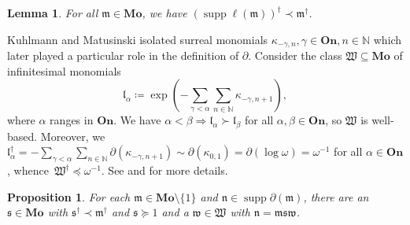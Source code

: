 \documentclass{article}
\newcommand{\assign}{\coloneqq}
\newcommand{\tmop}[1]{\ensuremath{\operatorname{#1}}}
\newtheorem{proposition}[theorem]{Proposition}
\newtheorem{lemma}[theorem]{Lemma}
\theoremstyle{remark}\newtheorem*{convention*}{Convention}
\begin{document}
\begin{lemma}
  \label{lem-flatness-log}For all $\mathfrak{m} \in \mathbf{Mo}$, we have
  $(\tmop{supp} \ell (\mathfrak{m}))^{\dag} \prec \mathfrak{m}^{\dag}$.
\end{lemma}

Kuhlmann and Matusinski isolated {\cite[Section~4]{KM15}} surreal monomials
$\kappa_{- \gamma, n}, \gamma \in \mathbf{On}, n \in \mathbb{N}$ which later
played a particular role in the definition of $\partial$. Consider the class
$\mathfrak{W} \subseteq \mathbf{Mo}$ of infinitesimal monomials
\[ \mathfrak{l}_{\alpha} \assign \exp \left( - \sum_{\gamma < \alpha} \sum_{n
   \in \mathbb{N}} \kappa_{- \gamma, n + 1} \right), \]
where $\alpha$ ranges in $\mathbf{On}$. We have $\alpha < \beta
\Longrightarrow \mathfrak{l}_{\alpha} \succ \mathfrak{l}_{\beta}$ for all
$\alpha, \beta \in \mathbf{On}$, so $\mathfrak{W}$ is well-based. Moreover, we
$\mathfrak{l}_{\alpha}^{\dag} = - \sum_{\gamma < \alpha} \sum_{n \in
\mathbb{N}} \partial (\kappa_{- \gamma, n + 1}) \sim \partial (\kappa_{0, 1})
= \partial (\log \omega) = \omega^{- 1}$ for all $\alpha \in \mathbf{On}$,
whence~$\mathfrak{W}^{\dag} \preccurlyeq \omega^{- 1}$. See
{\cite[Section~5.3]{BM18}} and {\cite[Section~2]{vdH:bm}} for more details.

\begin{proposition}
  \label{prop-near-support-No}For each $\mathfrak{m} \in \mathbf{Mo} \setminus
  \{1\}$ and $\mathfrak{n} \in \tmop{supp} \partial (\mathfrak{m})$, there are
  an $\mathfrak{s} \in \mathbf{Mo}$ with $\mathfrak{s}^{\dag} \prec
  \mathfrak{m}^{\dag}$ and $\mathfrak{s} \succcurlyeq 1$ and a $\mathfrak{w}
  \in \mathfrak{W}$ with $\mathfrak{n}=\mathfrak{m}\mathfrak{s}\mathfrak{w}$.
\end{proposition}
\end{document}
